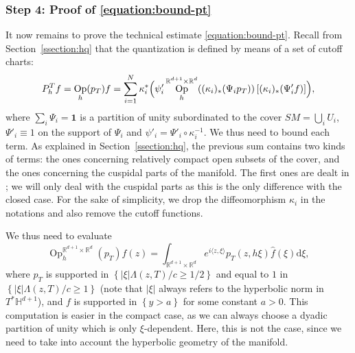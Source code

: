 \documentclass[JEP,XML,SOM,Unicode,NoFloatCountersInSection]{cedram}
\newcommand{\R}{\mathbb{R}}
\newcommand{\HH}{\mathbb{H}}
\newcommand{\dd}{\mathrm{d}}
\DeclareMathOperator{\Op}{Op}
\theoremstyle{plain}
\theoremstyle{definition}
\begin{document}
\subsubsection*{Step 4: Proof of \eqref{equation:bound-pt}}
It now remains to prove the technical estimate \eqref{equation:bound-pt}. Recall from Section~\ref{ssection:hq} that the quantization is defined by means of a set of cutoff charts:
\[
P_h^T f = \Op_h(p_T)f = \sum_{i=1}^N \kappa_i^*\Bigl( \psi'_i \Op^{\R^{d+1} \times \R^d}_h( (\kappa_i)_*(\Psi_i p_T))\left[(\kappa_i)_*(\Psi'_i f) \right] \Bigr),
\]
where $\sum_i \Psi_i = \mathbf{1}$ is a partition of unity subordinated to the cover $SM=\bigcup_i U_i$, $\Psi'_i \equiv 1$ on the support of $\Psi_i$ and $\psi'_i = \Psi'_i \circ \kappa_i^{-1}$. We thus need to bound each term. As explained in Section~\ref{ssection:hq}, the previous sum contains two kinds of terms: the ones concerning relatively compact open subsets of the cover, and the ones concerning the cuspidal parts of the manifold. The first ones are dealt in \cite[Lem.\,3.3]{Bonthonneau-Lefeuvre-21}; we will only deal with the cuspidal parts as this is the only difference with the closed case. For the sake of simplicity, we drop the diffeomorphism $\kappa_i$ in the notations and also remove the cutoff functions.

We thus need to evaluate
\[
\Op^{\R^{d+1} \times \R^d}_h( p_T )f (z) = \int_{\R^{d+1} \times \R^d} e^{i \langle z, \xi \rangle} p_T(z,h\xi) \hat{f}(\xi) \dd \xi,
\]
where $p_T$ is supported in $\left\{|\xi| \Lambda(z,T)/c \geq 1/2 \right\}$ and equal to $1$ in $\left\{ |\xi| \Lambda(z,T)/c \geq 1 \right\}$ (note that $|\xi|$ always refers to the hyperbolic norm in $T^*\HH^{d+1}$), and $f$ is supported in $\left\{y > a \right\}$ for some constant $a > 0$. This computation is easier in the compact case, as we can always choose a dyadic partition of unity which is only $\xi$-dependent. Here, this is not the case, since we need to take into account the hyperbolic geometry of the manifold.
\end{document}
